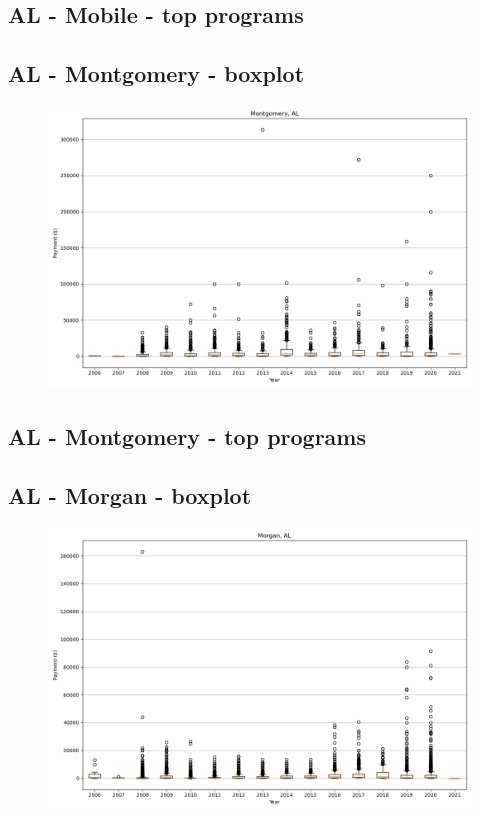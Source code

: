 \subsection*{AL - Mobile - top programs}

\newpage
\subsection*{AL - Montgomery - boxplot}
\begin{figure}[h]
\centering
\includegraphics[width=7in]{../output/boxplots/counties/Montgomery-AL_boxplot.png}
\end{figure}


\subsection*{AL - Montgomery - top programs}

\newpage
\subsection*{AL - Morgan - boxplot}
\begin{figure}[h]
\centering
\includegraphics[width=7in]{../output/boxplots/counties/Morgan-AL_boxplot.png}
\end{figure}


